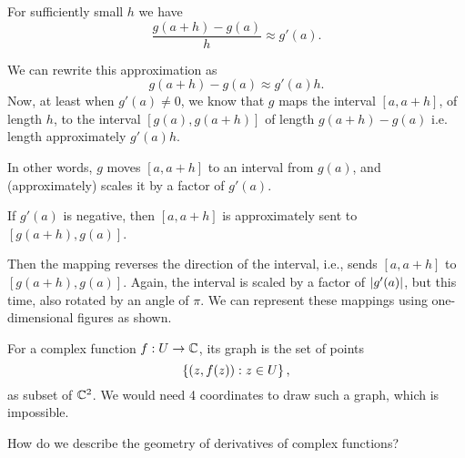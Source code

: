 For sufficiently small $h$ we have
\[
\frac{g(a+h)-g(a)}{h} \approx g'(a).
\]
\begin{blankbox}
We can rewrite this approximation as
\[
g(a+h)-g(a) \approx g'(a) h.
\]
Now, at least when $g'(a) \neq 0$, we know that $g$ maps the interval $[a,a+h]$, of length $h$, to the interval $[g(a),g(a+h)]$ of length $g(a+h)-g(a)$  i.e. length approximately $g'(a)h$. 

In other words, $g$ moves $[a,a+h]$ to an interval from $g(a)$, and (approximately) scales it by a factor of $g'(a)$.
\end{blankbox}
If $g'(a)$ is negative, then $[a,a+h]$ is approximately sent to $[g(a+h),g(a)]$. 
\begin{blankbox}
Then the mapping reverses the direction of the interval, i.e., sends $[a,a+h]$ to $[g(a+h),g(a)]$.  Again, the interval is scaled by a factor of $\left| g'(a) \right|$, but this time, also rotated by an angle of $\pi$.  We can represent these mappings using one-dimensional figures as shown.

{
\centering
}
\end{blankbox}

For a complex function $f:U \to \mathbb{C}$, its graph is the set of points
\[
\left\{ (z,f(z)): z \in U \right\},
\]
as subset of $\mathbb{C}^2$.  We would need 4 coordinates to draw such a graph, which is impossible.

\begin{question}
How do we describe the geometry of derivatives of complex functions?
\end{question}

